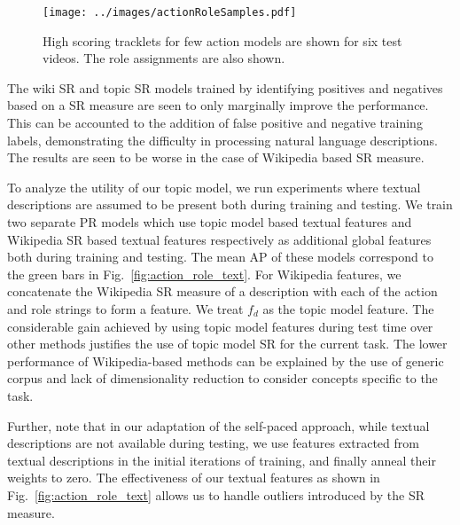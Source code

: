 \documentclass[10pt,twocolumn,letterpaper]{article}
\begin{document}
\begin{figure}[ht]
\centering
   \texttt{[image: ../images/actionRoleSamples.pdf]}
      \caption{High scoring tracklets for few action models are shown for six test videos. The role assignments are also shown.}
\label{fig:actionRoleSamples}
\end{figure}
\vspace*{-5pt}

The wiki SR and topic SR models trained by identifying positives and negatives based on a SR measure are seen to only marginally improve the performance. This can be accounted to the addition of false positive and negative training labels, demonstrating the difficulty in processing natural language descriptions. The results are seen to be worse in the case of Wikipedia based SR measure. %

To analyze the utility of our topic model, we run experiments 
where textual descriptions are assumed to be present both
during training and testing. We train two separate PR models which use topic
model based textual features and Wikipedia SR based textual features
respectively as additional global features both during training and testing.
The mean AP of these models correspond to the green bars in
Fig.~\ref{fig:action_role_text}. For Wikipedia features, we concatenate the
Wikipedia SR measure of a description with each of the action and role strings
to form a feature. We treat $f_d$ as the topic model feature. The
considerable gain achieved by using topic model features during test time over
other methods justifies the use of topic model SR for the current task. The
lower performance of Wikipedia-based methods can be explained by the use of
generic corpus and lack of dimensionality reduction to consider concepts
specific to the task.

Further, note that in our adaptation of the self-paced approach, 
while textual descriptions are not available during testing, 
we use features extracted from textual descriptions in the initial iterations of training, 
and finally anneal their weights to zero. The effectiveness of our textual features as shown in Fig.~\ref{fig:action_role_text} allows us to 
handle outliers introduced by the SR measure.
\end{document}
